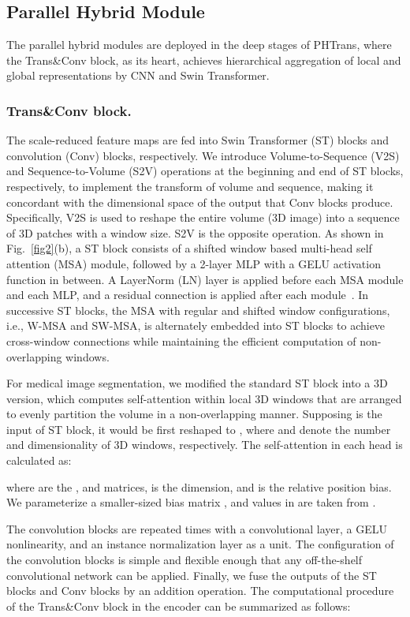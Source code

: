\documentclass[runningheads]{llncs}
\begin{document}
\subsection{Parallel Hybrid Module}
The parallel hybrid modules are deployed in the deep stages of PHTrans, where the Trans\&Conv block, as its heart, achieves hierarchical aggregation of local and global representations by CNN and Swin Transformer.

\subsubsection{Trans\&Conv block.}
The scale-reduced feature maps are fed into Swin Transformer (ST) blocks and convolution (Conv) blocks, respectively. We introduce Volume-to-Sequence (V2S) and Sequence-to-Volume (S2V) operations at the beginning and end of ST blocks, respectively, to implement the transform of volume and sequence, making it concordant with the dimensional space of the output that Conv blocks produce. Specifically, V2S is used to reshape the entire volume (3D image) into a sequence of 3D patches with a window size. S2V is the opposite operation. As shown in Fig.~\ref{fig2}(b), a ST block consists of a shifted window based multi-head self attention (MSA) module, followed by a 2-layer MLP with a GELU activation function in between. A LayerNorm (LN) layer is applied before each MSA module and each MLP, and a residual connection is applied after each module~\cite{Swin}. In  successive ST blocks, the MSA with regular and shifted window configurations, i.e., W-MSA and SW-MSA, is alternately embedded into ST blocks to achieve cross-window connections while maintaining the efficient computation of non-overlapping windows.

For medical image segmentation, we modified the standard ST block into a 3D version, which computes self-attention within local 3D windows that are arranged to evenly partition the volume in a non-overlapping manner. Supposing  is the input of ST block, it would be first reshaped to , where  and  denote the number and dimensionality of 3D windows, respectively. The self-attention in each head is calculated as:


where  are the ,  and  matrices,  is the  dimension, and  is the relative position bias. We parameterize a smaller-sized bias matrix , and values in  are taken from .

The convolution blocks are repeated  times with a  convolutional layer, a GELU nonlinearity, and an instance normalization layer as a unit. The configuration of the convolution blocks is simple and flexible enough that any off-the-shelf convolutional network can be applied. Finally, we fuse the outputs of the ST blocks and Conv blocks by an addition operation. The computational procedure of the Trans\&Conv block in the encoder can be summarized as follows:
\end{document}
